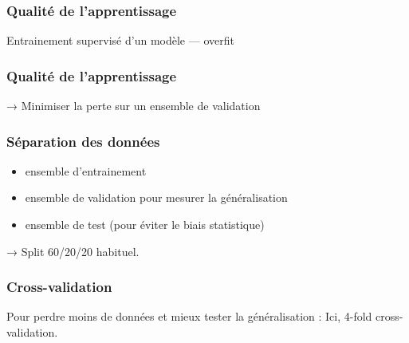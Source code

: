 \begin{frame}
  \frametitle{Qualité de l'apprentissage}
  Entrainement supervisé d'un modèle — overfit
\end{frame}

\begin{frame}
  \frametitle{Qualité de l'apprentissage}
  → Minimiser la perte sur un ensemble de validation
\end{frame}

\begin{frame}
  \frametitle{Séparation des données}
  \begin{itemize}
  \item ensemble d'entrainement
  \item ensemble de validation pour mesurer la généralisation
  \item ensemble de test (pour éviter le biais statistique)
  \end{itemize}
  → Split 60/20/20 habituel.
\end{frame}

\begin{frame}
  \frametitle{Cross-validation}
  Pour \og perdre\fg{} moins de données et mieux tester la
  généralisation :
  Ici, 4-fold cross-validation.
\end{frame}

